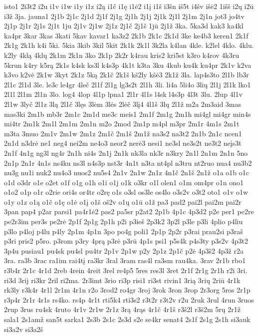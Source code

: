{isto1
2i3t2
i2u
i1v
i1w
i1y
i1z
i2ą
i1č
i1ę
i1ė2
i1į
i1š
i3šn
iš5t
i4šv
išė2
1išš
i2ų
i2ū
i3ž
3ja.
jauna1
2j1b
2j1c
2j1d
2j1f
2j1g
2j1h
2j1j
2j1k
2j1l
2j1m
2j1n
jot3
jo4tv
2j1p
2j1r
2j1s
2j1t
1ju
2j1v
2j1w
2j1z
2j1č
2j1š
1jū
2j1ž
3ka.
5ka3d
kak3
ka4kl
ka4pr
3kar
3kas
3kati
5kav
kavar1
ka3z2
2k1b
2k1c
2k1d
3ke
ke4b3
keren1
2k1f
2k1g
2k1h
k4i
5ki.
5kia
3kib
3kil
5kit
2k1k
2k1l
3k2la
k4lan
4kle.
k2lel
4klo.
4klu.
k2ly
4klą
4klų
2k1m
2k1n
3ko
2k1p
2k2r
k4rau
kris2
kri5st
k3ro
k4rov
4k3ru
5krun
k4ry
k5rą
2k1s
k4sk
ks3l
k4s3p
4k1t
k3ta
3ku
4kub
ku4k
ku4pr
2k1v
k2va
k3vo
k2vė
2k1w
3kyt
2k1z
5ką
2k1č
2k1š
kš2ly
kšė3
2k1ž
3la.
lap4s3to
2l1b
lb3r
2l1c
2l1d
3le.
le3c
le4gr
4leč
2l1f
2l1g
lg3s2t
2l1h
3li.
li4a
5li4o
3lių
2l1j
2l1k
lko1
2l1l
2l1m
2l1n
3lo.
log4
4lop
4l1p
lpna1
2l1r
4l1s
l4sk
l4s3p
4l3t
3lu.
2lup
4l1v
2l1w
3lyč
2l1z
3lą
2l1č
3lęs
3lėm
3lės
2lėč
3lį4
4l1š
3lų
2l1ž
m2a
2m3aid
3mas
mas3ki
2m1b
mb3r
2m1c
2m1d
me3c
meis1
2m1f
2m1g
2m1h
mi4gl
mi4gr
min4s
mi4tr
2m1k
2m1l
2m1m
2m1n
m2o
2mod
2m1p
m4pl
m3pr
2m1r
4m1s
2m1t
m3ta
3muo
2m1v
2m1w
2m1z
2m1č
2m1š
2m1ž
na3s2
na3t2
2n1b
2n1c
ncen1
2n1d
n3drė
ne1
neg4
nei2m
ne4o3
neor2
nerė3
nesi1
ne3sl
ne3s2t
ne3t2
neįs3t
2n1f
4n1g
ng3l
ng4r
2n1h
ni4s
2n1j
2n1k
nk3la
nk3r
n3kry
2n1l
2n1m
2n1n
5no
2n1p
2n1r
4n1s
ns4ku
ns3l
n4s3p
nst3r
4n1t
n3ta
nt4pl
n3tru
nt2ruo
nua4
nu3b2
nu3g
nu1i
nuk2
nu4o3
nuos2
nu5s4
2n1v
2n1w
2n1z
4n1č
2n1š
2n1ž
o1a
o1b
o1c
o1d
o3dr
o1e
o2et
o1f
o1g
o1h
o1i
o1j
o1k
o3kr
o1l
olen1
o1m
om4pr
o1n
ono1
o1o2
o1p
o1r
o2rie
ori4s
or4tr
o2rę
o1s
o3sl
os3le
os4lo
o3s2v
o3t2
oto1
o1v
o1w
o1y
o1z
o1ą
o1č
o1ę
o1ė
o1į
o1š
oš2v
o1ų
o1ū
o1ž
pa3
pad2
pai2l
pai2m
pai2r
3pan
pap4
p2ar
parsi1
pa4r1ė2
pas2
pa5sr
p2at2
2p1b
4p1c
4p3d2
p2e
per1
pe2re
pe2r3im
per3s
pe2rė
2p1f
2p1g
2p1h
p2i
p3ieš
2p3k2
3p2l
p3le
p3li
4plio
p4liu
p3lo
p4loj
p4lu
p4ly
2p1m
4p1n
3po
po4g
poli1
2p1p
2p2r
p3rai
prau2si
p3raš
p3ri
pris2
p5ro.
p3rom
p3ry
4prą
p3rė
p3rū
4p1s
psi1
p5s4k
p4s3ty
p3s2v
4p3t2
3p4u
pusiau1
pu4sk
pu4sl
pu4tr
2p1v
2p1w
p2y
2p1z
2p1č
p2ė
4p3š2
4p3ž
r2a
3ra.
ra3b
3rac
ra1im
rai4tį
ra3kr
3ral
3ram
ras4l
ra3sm
rau4ka.
3rav
2r1b
rbo1
r3b4r
2r1c
4r1d
2reb
4rein
4reit
3rel
re4p5
5res
res3l
3ret
2r1f
2r1g
2r1h
r2i
3ri.
ri3d
3rij
ri3kr
2ril
ri2ma.
2r3imt
3rio
ri3p
risi1
ri3st
rivin1
3rią
3rių
2riū
4r1k
rk3ly
r3k4r
4r1l
2r1m
4r1n
r2o
3rod2
ro4gr
3roj
3rok
3ron
3rop
2r3org
5ros
2r1p
r3p4r
2r1r
4r1s
rs4ko.
rs4p
4r1t
rti5k4
rti3s2
r3t2r
r3t2v
r2u
2ruk
3rul
4run
3ruos
2rup
3rus
ru4sk
4ruto
4r1v
2r1w
2r1z
3rą
4rąs
4r1č
4r1š
r3š2l
r3š2m
5rų
2r1ž
sala1
2s1amž
san5t
sarka1
2s3b
2s1c
2s3d
s2e
se4kr
senat4
2s1f
2s1g
2s1h
si3auk
si3a2v
si3a2š
}
